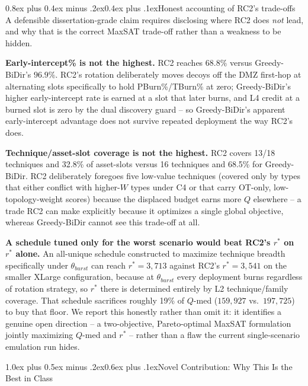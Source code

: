 \documentclass[10pt,twocolumn]{article}
\makeatletter
\renewcommand{\section}{\@startsection{section}{1}{0pt}%
  {1.0ex plus 0.5ex minus .2ex}{0.6ex plus .1ex}{\normalfont\large\bfseries}}
\renewcommand{\subsection}{\@startsection{subsection}{2}{0pt}%
  {0.8ex plus 0.4ex minus .2ex}{0.4ex plus .1ex}{\normalfont\bfseries}}
\makeatother
\begin{document}
\subsection{Honest accounting of RC2's trade-offs}
A defensible dissertation-grade claim requires disclosing where RC2 does \emph{not} lead, and why that is the correct MaxSAT trade-off rather than a weakness to be hidden.

\textbf{Early-intercept\% is not the highest.} RC2 reaches $68.8\%$ versus Greedy-BiDir's $96.9\%$. RC2's rotation deliberately moves decoys off the DMZ first-hop at alternating slots specifically to hold PBurn\%/TBurn\% at zero; Greedy-BiDir's higher early-intercept rate is earned at a slot that later burns, and L4 credit at a burned slot is zero by the dual discovery guard -- so Greedy-BiDir's apparent early-intercept advantage does not survive repeated deployment the way RC2's does.

\textbf{Technique/asset-slot coverage is not the highest.} RC2 covers 13/18 techniques and 32.8\% of asset-slots versus 16 techniques and 68.5\% for Greedy-BiDir. RC2 deliberately foregoes five low-value techniques (covered only by types that either conflict with higher-$W$ types under C4 or that carry OT-only, low-topology-weight scores) because the displaced budget earns more $Q$ elsewhere -- a trade RC2 can make explicitly because it optimizes a single global objective, whereas Greedy-BiDir cannot see this trade-off at all.

\textbf{A schedule tuned only for the worst scenario would beat RC2's $r^*$ on $r^*$ alone.} An all-unique schedule constructed to maximize technique breadth specifically under $\theta_{burst}$ can reach $r^*{=}3{,}713$ against RC2's $r^*{=}3{,}541$ on the smaller XLarge configuration, because at $\theta_{burst}$ every deployment burns regardless of rotation strategy, so $r^*$ there is determined entirely by L2 technique/family coverage. That schedule sacrifices roughly 19\% of $Q$-med ($159{,}927$ vs.\ $197{,}725$) to buy that floor. We report this honestly rather than omit it: it identifies a genuine open direction -- a two-objective, Pareto-optimal MaxSAT formulation jointly maximizing $Q$-med and $r^*$ -- rather than a flaw the current single-scenario emulation run hides.

\section{Novel Contribution: Why This Is the Best in Class}\label{sec:discussion}
\end{document}
